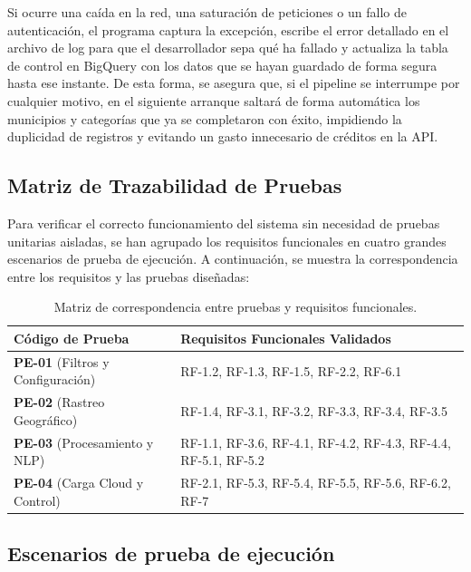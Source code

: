 Si ocurre una caída en la red, una saturación de peticiones o un fallo de autenticación, el programa captura la excepción, escribe el error detallado en el archivo de log para que el desarrollador sepa qué ha fallado y actualiza la tabla de control en BigQuery con los datos que se hayan guardado de forma segura hasta ese instante. De esta forma, se asegura que, si el pipeline se interrumpe por cualquier motivo, en el siguiente arranque saltará de forma automática los municipios y categorías que ya se completaron con éxito, impidiendo la duplicidad de registros y evitando un gasto innecesario de créditos en la API.

\subsection{Matriz de Trazabilidad de Pruebas}
Para verificar el correcto funcionamiento del sistema sin necesidad de pruebas unitarias aisladas, se han agrupado los requisitos funcionales en cuatro grandes escenarios de prueba de ejecución. A continuación, se muestra la correspondencia entre los requisitos y las pruebas diseñadas:

\begin{table}[htbp]
	\centering
	\begin{tabularx}{\linewidth}{ p{} X }
		\toprule
		\textbf{Código de Prueba} & \textbf{Requisitos Funcionales Validados} \\
		\toprule
		\textbf{PE-01} (Filtros y Configuración) & RF-1.2, RF-1.3, RF-1.5, RF-2.2, RF-6.1 \\ \midrule
		\textbf{PE-02} (Rastreo Geográfico)      & RF-1.4, RF-3.1, RF-3.2, RF-3.3, RF-3.4, RF-3.5 \\ \midrule
		\textbf{PE-03} (Procesamiento y NLP)     & RF-1.1, RF-3.6, RF-4.1, RF-4.2, RF-4.3, RF-4.4, RF-5.1, RF-5.2 \\ \midrule
		\textbf{PE-04} (Carga Cloud y Control)   & RF-2.1, RF-5.3, RF-5.4, RF-5.5, RF-5.6, RF-6.2, RF-7 \\
		\bottomrule
	\end{tabularx}
	\caption{Matriz de correspondencia entre pruebas y requisitos funcionales.}
\end{table}


\subsection{Escenarios de prueba de ejecución}

